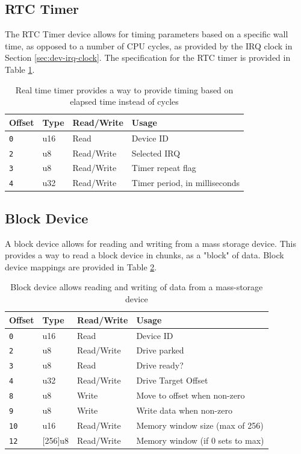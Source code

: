 \documentclass{article}
\begin{document}
\subsection{RTC Timer}
\label{sec:dev-rtc-timer}

The RTC Timer device allows for timing parameters based on a specific wall time, as opposed to a number of CPU cycles, as provided by the IRQ clock in Section \ref{sec:dev-irq-clock}. The specification for the RTC timer is provided in Table \ref{table:dev-rtc-timer}.

\begin{table}[h!]
	\centering
	\begin{tabular}{l|lll}
		\hline
		Offset & Type & Read/Write & Usage \\
		\hline
		\texttt{0} & u16 & Read & Device ID \\
		\texttt{2} & u8 & Read/Write & Selected IRQ \\
		\texttt{3} & u8 & Read/Write & Timer repeat flag \\
		\texttt{4} & u32 & Read/Write & Timer period, in milliseconds \\
		\hline
	\end{tabular}
	\caption{Real time timer provides a way to provide timing based on elapsed time instead of cycles}
	\label{table:dev-rtc-timer}
\end{table}

\subsection{Block Device}
\label{sec:dev-block-device}

A block device allows for reading and writing from a mass storage device. This provides a way to read a block device in chunks, as a "block" of data. Block device mappings are provided in Table \ref{table:dev-block-device}.

\begin{table}[h!]
	\centering
	\begin{tabular}{l|lll}
		\hline
		Offset & Type & Read/Write & Usage \\
		\hline
		\texttt{0} & u16 & Read & Device ID \\
		\texttt{2} & u8 & Read/Write & Drive parked  \\
		\texttt{3} & u8 & Read & Drive ready? \\
		\texttt{4} & u32 & Read/Write & Drive Target Offset \\
		\texttt{8} & u8 & Write & Move to offset when non-zero \\
		\texttt{9} & u8 & Write & Write data when non-zero \\
		\texttt{10} & u16 & Read/Write & Memory window size (max of 256) \\
		\texttt{12} & [256]u8 & Read/Write & Memory window (if 0 sets to max) \\
		\hline
	\end{tabular}
	\caption{Block device allows reading and writing of data from a mass-storage device}
	\label{table:dev-block-device}
\end{table}
\end{document}
